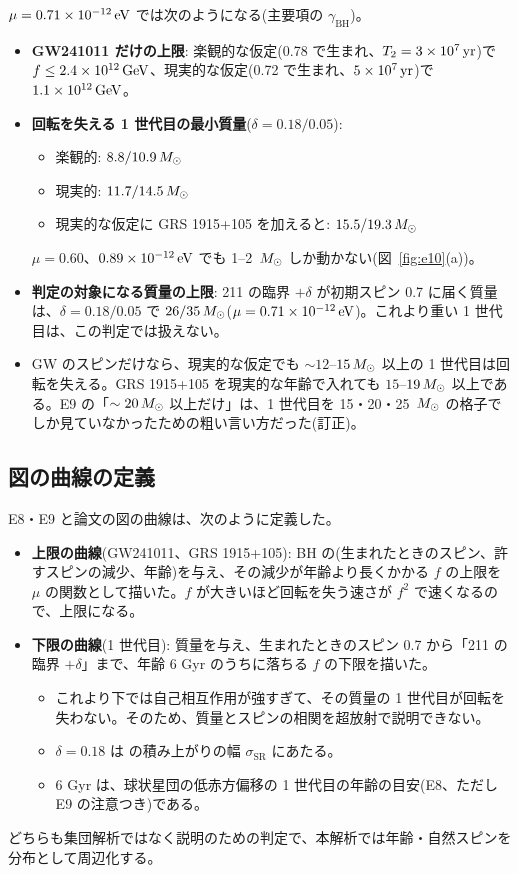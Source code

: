 \begin{result}
$\mu=0.71\times10^{-12}\,\mathrm{eV}$ では次のようになる(主要項の $\gamma_\mathrm{BH}$)。
\begin{itemize}
\item \textbf{GW241011 だけの上限}: 楽観的な仮定(0.78 で生まれ、$T_2=3\times10^7\,\mathrm{yr}$)で $f\le2.4\times10^{12}\,\mathrm{GeV}$、現実的な仮定(0.72 で生まれ、$5\times10^7\,\mathrm{yr}$)で $1.1\times10^{12}\,\mathrm{GeV}$。
\item \textbf{回転を失える 1 世代目の最小質量}($\delta=0.18/0.05$):
  \begin{itemize}
  \item 楽観的: $8.8/10.9\,M_\odot$
  \item 現実的: $11.7/14.5\,M_\odot$
  \item 現実的な仮定に GRS 1915+105 を加えると: $15.5/19.3\,M_\odot$
  \end{itemize}
  $\mu=0.60$、$0.89\times10^{-12}\,\mathrm{eV}$ でも 1--2 $\,M_\odot$ しか動かない(図~\ref{fig:e10}(a))。
\item \textbf{判定の対象になる質量の上限}: 211 の臨界 $+\delta$ が初期スピン 0.7 に届く質量は、$\delta=0.18/0.05$ で $26/35\,M_\odot$($\mu=0.71\times10^{-12}\,\mathrm{eV}$)。これより重い 1 世代目は、この判定では扱えない。
\item GW のスピンだけなら、現実的な仮定でも $\sim12$--$15\,M_\odot$ 以上の 1 世代目は回転を失える。GRS 1915+105 を現実的な年齢で入れても $15$--$19\,M_\odot$ 以上である。E9 の「$\sim20\,M_\odot$ 以上だけ」は、1 世代目を 15・20・25 $\,M_\odot$ の格子でしか見ていなかったための粗い言い方だった(訂正)。
\end{itemize}
\end{result}

\subsection{図の曲線の定義}

E8・E9 と論文の図の曲線は、次のように定義した。
\begin{itemize}
\item \textbf{上限の曲線}(GW241011、GRS 1915+105): BH の(生まれたときのスピン、許すスピンの減少、年齢)を与え、その減少が年齢より長くかかる $f$ の上限を $\mu$ の関数として描いた。$f$ が大きいほど回転を失う速さが $f^2$ で速くなるので、上限になる。
\item \textbf{下限の曲線}(1 世代目): 質量を与え、生まれたときのスピン 0.7 から「211 の臨界 $+\delta$」まで、年齢 6 Gyr のうちに落ちる $f$ の下限を描いた。
  \begin{itemize}
  \item これより下では自己相互作用が強すぎて、その質量の 1 世代目が回転を失わない。そのため、質量とスピンの相関を超放射で説明できない。
  \item $\delta=0.18$ は  の積み上がりの幅 $\sigma_\mathrm{SR}$ にあたる。
  \item 6 Gyr は、球状星団の低赤方偏移の 1 世代目の年齢の目安(E8、ただし E9 の注意つき)である。
  \end{itemize}
\end{itemize}
どちらも集団解析ではなく説明のための判定で、本解析では年齢・自然スピンを分布として周辺化する。


